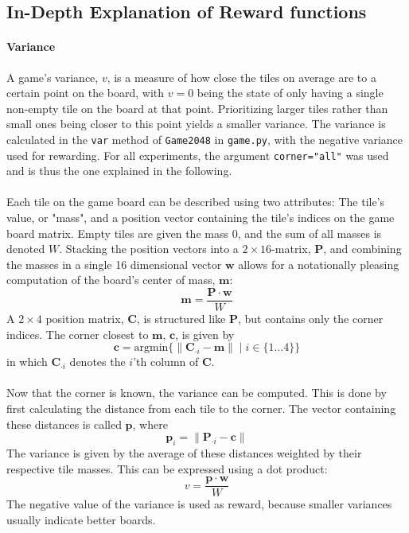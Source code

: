 \documentclass[11pt, fleqn]{article}
\newcommand{\code}[1]{{\texttt{\footnotesize#1}}}
\newcommand{\argmin}{\ensuremath{\text{argmin}}}
\begin{document}
\subsection{In-Depth Explanation of Reward functions}\label{reward}
\paragraph*{Variance}
A game's variance, $ v $, is a measure of how close the tiles on average are to a certain point on the board, with $ v=0 $ being the state of only having a single non-empty tile on the board at that point. Prioritizing larger tiles rather than small ones being closer to this point yields a smaller variance. The variance is calculated in the \code{var} method of \code{Game2048} in \code{game.py}, with the negative variance used for rewarding. For all experiments, the argument \code{corner="all"} was used and is thus the one explained in the following.
\\\\
Each tile on the game board can be described using two attributes: The tile's value, or "mass", and a position vector containing the tile's indices on the game board matrix. Empty tiles are given the mass 0, and the sum of all masses is denoted $ W $. Stacking the position vectors into a $ 2\times 16 $-matrix, $ \mathbf P $, and combining the masses in a single 16 dimensional vector $ \mathbf w $ allows for a notationally pleasing computation of the board's center of mass, $ \mathbf m $:
\begin{equation*}
	\mathbf m=\frac{\mathbf P\cdot\mathbf w}{W}
\end{equation*}
A $ 2\times 4 $ position matrix, $ \mathbf C $, is structured like $ \mathbf P $, but contains only the corner indices. The corner closest to $ \mathbf m $, $ \mathbf c $, is given by
\begin{equation*}
	\mathbf c=\argmin\{\|\mathbf{C}_{\cdot i}-\mathbf m\|\mid i\in\{1...4\}\}
\end{equation*}
in which $ \mathbf C_{\cdot i} $ denotes the $ i $'th column of $ \mathbf C $.
\\\\
Now that the corner is known, the variance can be computed. This is done by first calculating the distance from each tile to the corner. The vector containing these distances is called $ \mathbf p $, where
\begin{equation*}
	\mathbf p_i=\|\mathbf P_{\cdot i}-\mathbf c\|
\end{equation*}
The variance is given by the average of these distances weighted by their respective tile masses. This can be expressed using a dot product:
\begin{equation*}
	v=\frac{\mathbf p\cdot\mathbf w}{W}
\end{equation*}
The negative value of the variance is used as reward, because smaller variances usually indicate better boards.
\end{document}
